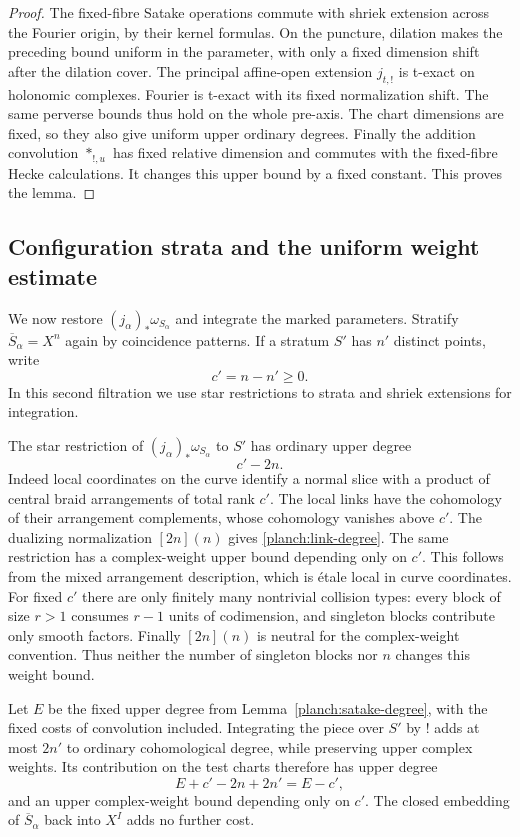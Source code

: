 \begin{proof}
The fixed-fibre Satake operations commute with shriek extension
across the Fourier origin, by their kernel formulas.  On the
puncture, dilation makes the preceding bound uniform in the
parameter, with only a fixed dimension shift after the dilation
cover.  The principal affine-open extension $j_{t,!}$ is t-exact
on holonomic complexes.  Fourier is t-exact with its fixed
normalization shift.  The same perverse bounds thus hold on the
whole pre-axis.  The chart dimensions are fixed, so they also give
uniform upper ordinary degrees.  Finally the addition convolution
$*_{!,u}$ has fixed relative dimension and commutes with the
fixed-fibre Hecke calculations.  It changes this upper bound by a
fixed constant.  This proves the lemma.
\end{proof}

\subsection{Configuration strata and the uniform weight estimate}
\label{planch:configuration-estimate}

We now restore $(j_\alpha)_*\omega_{S_\alpha}$ and integrate the
marked parameters.  Stratify $\overline S_\alpha=X^n$ again by
coincidence patterns.  If a stratum $S'$ has $n'$ distinct points,
write
\[
 c'=n-n'\geq0.
\]
In this second filtration we use star restrictions to strata and
shriek extensions for integration.

The star restriction of $(j_\alpha)_*\omega_{S_\alpha}$ to $S'$
has ordinary upper degree
\begin{equation}
 c'-2n.
 \label{planch:link-degree}
\end{equation}
Indeed local coordinates on the curve identify a normal slice with
a product of central braid arrangements of total rank $c'$.  The
local links have the cohomology of their arrangement complements,
whose cohomology vanishes above $c'$.  The dualizing normalization
$[2n](n)$ gives \eqref{planch:link-degree}.
The same restriction has a complex-weight upper bound depending
only on $c'$.  This follows from the mixed arrangement description,
which is \'etale local in curve coordinates.  For fixed $c'$ there
are only finitely many nontrivial collision types: every block of
size $r>1$ consumes $r-1$ units of codimension, and singleton blocks
contribute only smooth factors.  Finally $[2n](n)$ is neutral for
the complex-weight convention.  Thus neither the number of singleton
blocks nor $n$ changes this weight bound.

Let $E$ be the fixed upper degree from
Lemma~\ref{planch:satake-degree}, with the fixed costs of convolution
included.  Integrating the piece over $S'$ by $!$ adds at most
$2n'$ to ordinary cohomological degree, while preserving upper
complex weights.  Its contribution on the test charts therefore
has upper degree
\begin{equation}
 E+c'-2n+2n'=E-c',
 \label{planch:codimension-decay}
\end{equation}
and an upper complex-weight bound depending only on $c'$.
The closed embedding of $\overline S_\alpha$ back into $X^I$ adds
no further cost.

